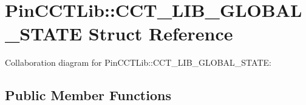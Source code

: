 \hypertarget{structPinCCTLib_1_1CCT__LIB__GLOBAL__STATE}{\section{Pin\-C\-C\-T\-Lib\-:\-:C\-C\-T\-\_\-\-L\-I\-B\-\_\-\-G\-L\-O\-B\-A\-L\-\_\-\-S\-T\-A\-T\-E Struct Reference}
\label{structPinCCTLib_1_1CCT__LIB__GLOBAL__STATE}
}


Collaboration diagram for Pin\-C\-C\-T\-Lib\-:\-:C\-C\-T\-\_\-\-L\-I\-B\-\_\-\-G\-L\-O\-B\-A\-L\-\_\-\-S\-T\-A\-T\-E\-:
\subsection*{Public Member Functions}
